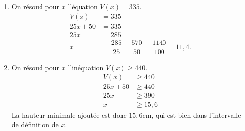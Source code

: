 {\begin{enumerate}
			$V(3) = 25\cdot3 + 50 = 125$.
		\item On résoud pour $x$ l'équation $V(x) = 335$.
			\begin{align*}
				V(x) &= 335 \\
				25x + 50 &= 335 \\
				25x &= 285 \\
				x &= \dfrac{285}{25} = \dfrac{570}{50} = \dfrac{1140}{100} = 11,4.
			\end{align*}
		\item On résoud pour $x$ l'inéquation $V(x) \geq 440$.
			\begin{align*}
				V(x) &\geq 440 \\
				25x + 50 &\geq 440 \\
				25x &\geq 390 \\
				x &\geq 15,6
			\end{align*}
			La hauteur minimale ajoutée est donc $15,6$cm, qui est bien dans l'intervalle de définition de $x$.
	\end{enumerate}

}

